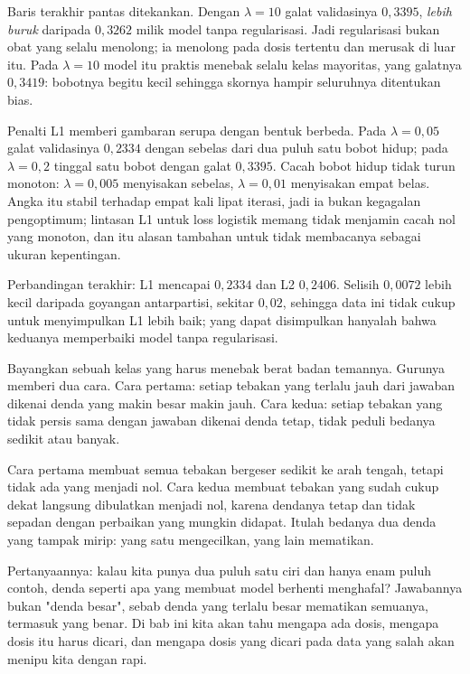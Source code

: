 Baris terakhir pantas ditekankan. Dengan $\lambda=10$ galat validasinya $0{,}3395$,
\emph{lebih buruk} daripada $0{,}3262$ milik model tanpa regularisasi. Jadi
regularisasi bukan obat yang selalu menolong; ia menolong pada dosis tertentu dan merusak
di luar itu. Pada $\lambda=10$ model itu praktis menebak selalu kelas mayoritas, yang
galatnya $0{,}3419$: bobotnya begitu kecil sehingga skornya hampir seluruhnya ditentukan
bias.

Penalti L1 memberi gambaran serupa dengan bentuk berbeda. Pada $\lambda=0{,}05$ galat
validasinya $0{,}2334$ dengan sebelas dari dua puluh satu bobot hidup; pada
$\lambda=0{,}2$ tinggal satu bobot dengan galat $0{,}3395$. Cacah bobot hidup tidak turun
monoton: $\lambda=0{,}005$ menyisakan sebelas, $\lambda=0{,}01$ menyisakan empat belas.
Angka itu stabil terhadap empat kali lipat iterasi, jadi ia bukan kegagalan pengoptimum;
lintasan L1 untuk loss logistik memang tidak menjamin cacah nol yang monoton, dan itu
alasan tambahan untuk tidak membacanya sebagai ukuran kepentingan.

Perbandingan terakhir: L1 mencapai $0{,}2334$ dan L2 $0{,}2406$. Selisih $0{,}0072$
lebih kecil daripada goyangan antarpartisi, sekitar $0{,}02$, sehingga data ini tidak
cukup untuk menyimpulkan L1 lebih baik; yang dapat disimpulkan hanyalah bahwa keduanya
memperbaiki model tanpa regularisasi.

\begin{untukanak}
Bayangkan sebuah kelas yang harus menebak berat badan temannya. Gurunya memberi dua
cara. Cara pertama: setiap tebakan yang terlalu jauh dari jawaban dikenai denda yang
makin besar makin jauh. Cara kedua: setiap tebakan yang tidak persis sama dengan
jawaban dikenai denda tetap, tidak peduli bedanya sedikit atau banyak.

Cara pertama membuat semua tebakan bergeser sedikit ke arah tengah, tetapi tidak ada
yang menjadi nol. Cara kedua membuat tebakan yang sudah cukup dekat langsung dibulatkan
menjadi nol, karena dendanya tetap dan tidak sepadan dengan perbaikan yang mungkin
didapat. Itulah bedanya dua denda yang tampak mirip: yang satu mengecilkan, yang lain
mematikan.

Pertanyaannya: kalau kita punya dua puluh satu ciri dan hanya enam puluh contoh, denda
seperti apa yang membuat model berhenti menghafal? Jawabannya bukan "denda besar",
sebab denda yang terlalu besar mematikan semuanya, termasuk yang benar. Di bab ini kita
akan tahu mengapa ada dosis, mengapa dosis itu harus dicari, dan mengapa dosis yang
dicari pada data yang salah akan menipu kita dengan rapi.
\end{untukanak}

